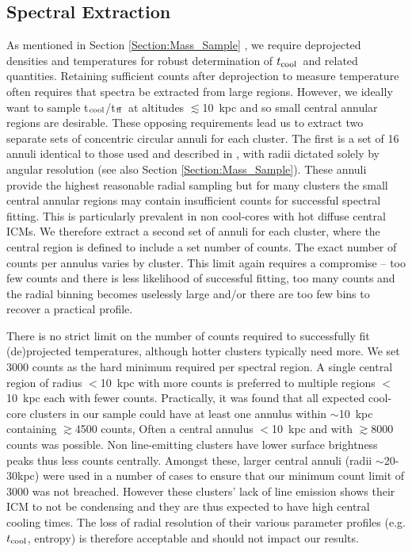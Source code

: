 \documentclass[twocolumn]{aastex6}
\newcommand{\tctff}{{t$_{\rm cool}$/t$_{\rm ff}$}}
\newcommand{\tc}{$t_{\rm cool}$}
\begin{document}
\subsection{Spectral Extraction}

As mentioned in Section \ref{Section:Mass_Sample} \cite[see also][]{Hogan17}, we require deprojected densities and temperatures for robust determination of \tc\ and related quantities.  Retaining sufficient counts after deprojection to measure temperature often requires that spectra be extracted from large regions.  However, we ideally want to sample \tctff\ at altitudes $\lesssim$10~kpc and so small central annular regions are desirable.  These opposing requirements lead us to extract two separate sets of concentric circular annuli for each cluster.  The first is a set of 16 annuli identical to those used and described in \citet[][]{Hogan17}, with radii dictated solely by angular resolution (see also Section \ref{Section:Mass_Sample}).  These annuli provide the highest reasonable radial sampling but for many clusters the small central annular regions may contain insufficient counts for successful spectral fitting.  This is particularly prevalent in non cool-cores with hot diffuse central ICMs.  We therefore extract a second set of annuli for each cluster, where the central region is defined to include a set number of counts.  The exact number of counts per annulus varies by cluster.  This limit again requires a compromise -- too few counts and there is less likelihood of successful fitting, too many counts and the radial binning becomes uselessly large and/or there are too few bins to recover a practical profile.

There is no strict limit on the number of counts required to successfully fit (de)projected temperatures, although hotter clusters typically need more.  We set 3000 counts as the hard minimum required per spectral region.  A single central region of radius $<$10~kpc with more counts is preferred to multiple regions $<$10~kpc each with fewer counts.  Practically, it was found that all expected cool-core clusters in our sample could have at least one annulus within $\sim$10~kpc containing $\gtrsim$4500 counts,  Often a central annulus $<$10~kpc and with $\gtrsim$8000 counts was possible.  Non line-emitting clusters have lower surface brightness peaks thus less counts centrally.  Amongst these, larger central annuli (radii $\sim$20-30kpc) were used in a number of cases to ensure that our minimum count limit of 3000 was not breached.  However these clusters' lack of line emission shows their ICM to not be condensing and they are thus expected to have high central cooling times. The loss of radial resolution of their various parameter profiles (e.g. \tc, entropy) is therefore acceptable and should not impact our results.
\end{document}
